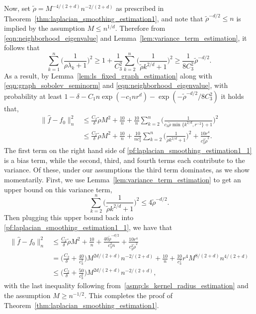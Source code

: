 \documentclass[twoside]{article}
\newcommand{\1}{\mathbf{1}}
\newcommand{\wt}[1]{\widetilde{#1}}
\newcommand{\wh}[1]{\widehat{#1}}
\theoremstyle{definition}
\theoremstyle{remark}
\begin{document}
Now, set $\wt{\rho} = M^{-4/(2 + d)}n^{-2/(2 + d)}$ as prescribed in Theorem~\ref{thm:laplacian_smoothing_estimation1}, and note that $\wt{\rho}^{-d/2} \leq n$ is implied by the assumption $M \leq n^{1/d}$. Therefore  from \eqref{eqn:neighborhood_eigenvalue} and Lemma~\ref{lem:variance_term_estimation}, it follows that
\begin{equation*}
\sum_{k = 1}^{n}\biggl(\frac{1}{\rho \lambda_k + 1}\biggr)^{2} \geq 1 + \frac{1}{C_3^2}\sum_{k = 2}^{n}\biggl(\frac{1}{\wt{\rho} k^{2/d} + 1}\biggr)^{2} \geq \frac{1}{8C_3^2} \wt{\rho}^{-d/2}.
\end{equation*}
As a result, by Lemma~\ref{lem:ls_fixed_graph_estimation} along with \eqref{eqn:graph_sobolev_seminorm} and \eqref{eqn:neighborhood_eigenvalue}, with probability at least $1 - \delta - C_1n\exp(-c_1nr^d) - \exp(-\wt{\rho}^{-d/2}/8C_3^2)$ it holds that,
\begin{align}
\|\wh{f} - f_0\|_n^2 & \leq \frac{C_2}{\delta} \wt{\rho} M^2 + \frac{10}{n} + \frac{10}{n}\sum_{k = 2}^{n} \Biggl(\frac{1}{c_3 \wt{\rho}\min\{k^{2/d},r^{-2}\} + 1}\Biggr)^2 \nonumber \\
& \leq \frac{C_2}{\delta} \wt{\rho} M^2 + \frac{10}{n} + \frac{10}{nc_3^2}\sum_{k = 2}^{n} \biggl(\frac{1}{\wt{\rho}k^{2/d} + 1}\biggr)^2 + \frac{10r^4}{c_3^2 \wt{\rho}^2}. \label{pf:laplacian_smoothing_estimation1_1}
\end{align}
The first term on the right hand side of \eqref{pf:laplacian_smoothing_estimation1_1} is a bias term, while the second, third, and fourth terms each contribute to the variance. Of these, under our assumptions the third term dominates, as we show momentarily. First, we use Lemma~\ref{lem:variance_term_estimation} to get an upper bound on this variance term,
\begin{equation*}
\sum_{k = 2}^{n}\biggl(\frac{1}{\wt{\rho}k^{2/d} + 1}\biggr)^2 \leq 4\wt{\rho}^{-d/2}.
\end{equation*}
Then plugging this upper bound back into \eqref{pf:laplacian_smoothing_estimation1_1}, we have that
\begin{align*}
\|\wh{f} - f_0\|_n^2 & \leq\frac{C_2}{\delta} \wt{\rho} M^2 + \frac{10}{n} + \frac{40\wt{\rho}^{-d/2}}{c_3^{2}n}  + \frac{10r^4}{c_3^2 \wt{\rho}^2} \\
& = \biggl(\frac{C_2}{\delta} + \frac{40}{c_3^{2}}\biggr)M^{2d/(2+d)} n^{-2/(2 + d)} + \frac{10}{n} + \frac{10}{c_3^2}r^4M^{8/(2 + d)}n^{4/(2 + d)} \\
& \leq \biggl(\frac{C_2}{\delta} + \frac{50}{c_3^{2}}\biggr)M^{2d/(2+d)} n^{-2/(2 + d)},
\end{align*}
with the last inequality following from~\ref{asmp:ls_kernel_radius_estimation} and the assumption $M \geq n^{-1/2}$. This completes the proof of Theorem~\ref{thm:laplacian_smoothing_estimation1}.
\end{document}
